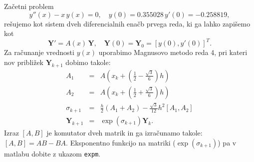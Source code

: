 \documentclass{article}
\begin{document}
Začetni problem 
\[y''(x)-x\,y(x)=0,\quad y(0)=0.355028\,y'(0)=-0.258819,\] 
rešujemo kot sistem dveh diferencialnih enačb prvega reda, ki ga lahko zapišemo
kot 
\[\mathbf{Y}'=A(x)\,\mathbf{Y},\quad \mathbf{Y}(0)=\mathbf{Y}_0
  =[y(0),y'(0)]^T.\] 
Za računanje vrednosti \(y(x)\) uporabimo Magnusovo metodo reda 4, pri kateri
nov približek \(\mathbf{Y}_{k+1}\) dobimo takole:
\[\begin{array}{ccc}
    A_1&=&A\left(x_k+\left(\frac{1}{2}-\frac{\sqrt{3}}{6}\right)h\right)\\
    A_2&=&A\left(x_k+\left(\frac{1}{2}+\frac{\sqrt{3}}{6}\right)h\right)\\
    \sigma_{k+1}&=&\frac{h}{2}(A_1+A_2)-\frac{\sqrt{3}}{12}h^2[A_1,A_2]\\
    \mathbf{Y}_{k+1}&=&\exp(\sigma_{k+1})\mathbf{Y}_k.
\end{array}\] 
Izraz \([A,B]\) je komutator dveh matrik in ga izračunamo takole:
\([A,B]=AB-BA\). 
Eksponentno funkcijo na matriki (\(\exp(\sigma_{k+1})\)) pa v matlabu dobite z ukazom \texttt{expm}.
\end{document}
